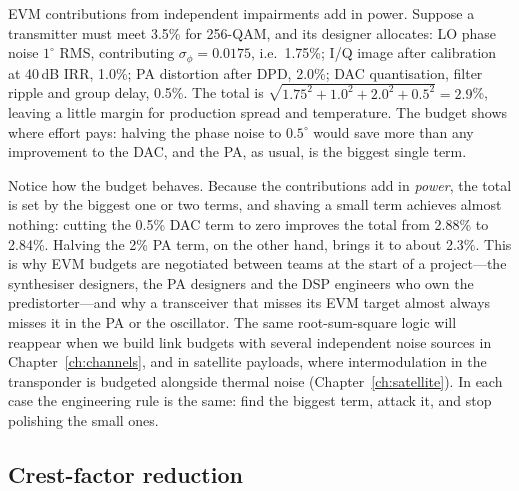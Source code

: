 \begin{worked}
EVM contributions from independent impairments add in power. Suppose a transmitter must meet 3.5\% for
256-QAM, and its designer allocates: LO phase noise $1^\circ$ RMS, contributing
$\sigma_\phi=0.0175$, i.e.\ 1.75\%; I/Q image after calibration at 40\,dB IRR, 1.0\%; PA distortion
after DPD, 2.0\%; DAC quantisation, filter ripple and group delay, 0.5\%. The total is
$\sqrt{1.75^2+1.0^2+2.0^2+0.5^2}=2.9$\%, leaving a little margin for production spread and temperature.
The budget shows where effort pays: halving the phase noise to $0.5^\circ$ would save more than any
improvement to the DAC, and the PA, as usual, is the biggest single term.
\end{worked}


Notice how the budget behaves. Because the contributions add in \emph{power}, the total is set by the
biggest one or two terms, and shaving a small term achieves almost nothing: cutting the 0.5\% DAC term
to zero improves the total from 2.88\% to 2.84\%. Halving the 2\% PA term, on the other hand, brings it
to about 2.3\%. This is why EVM budgets are negotiated between teams at the start of a project---the
synthesiser designers, the PA designers and the DSP engineers who own the predistorter---and why a
transceiver that misses its EVM target almost always misses it in the PA or the oscillator. The same
root-sum-square logic will reappear when we build link budgets with several independent noise sources
in Chapter~\ref{ch:channels}, and in satellite payloads, where intermodulation in the transponder is
budgeted alongside thermal noise (Chapter~\ref{ch:satellite}). In each case the engineering rule is the
same: find the biggest term, attack it, and stop polishing the small ones.

\subsection{Crest-factor reduction}

